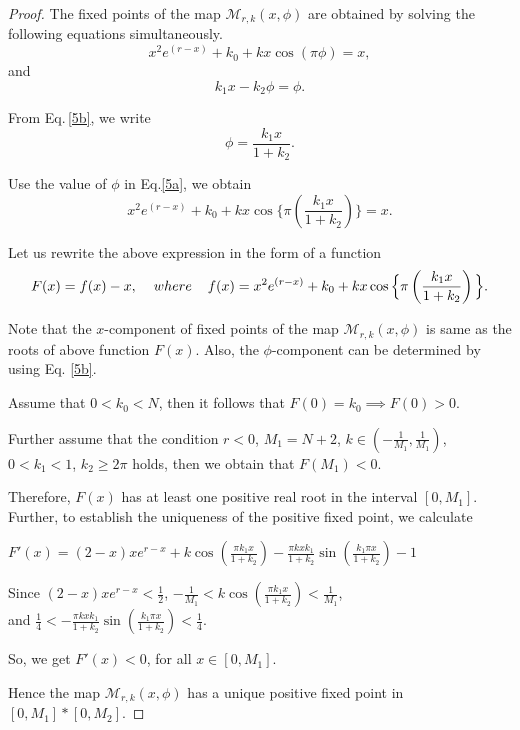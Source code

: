 \documentclass{article}
\begin{document}
\begin{proof}
     The fixed points of the map $\mathcal{M}_{r,k}(x,\phi)$ are obtained by solving the following equations simultaneously.
\begin{equation}\label{5a}
        x^2e^{(r-x)}+k_0+kx \cos(\pi\phi)=x,
\end{equation}
\noindent and
  \begin{equation}\label{5b}
         k_1x-k_2\phi=\phi.
  \end{equation}

\noindent From Eq.\,\eqref{5b}, we write
\begin{equation}\label{6}
    \phi=\frac{k_1x}{1+k_2}.
\end{equation}

\noindent Use the value of $\phi$ in Eq.\eqref{5a}, we obtain
\begin{equation}\label{7}
    x^2e^{(r-x)}+k_
0+kx \cos \Big\{\pi\left(\frac{k_1x}{1+k_2}\right) \Big\}=x.
\end{equation}

\noindent Let us rewrite the above expression in the form of a function
\begin{equation}\label{8}
   F(x)= f(x)-x, \hspace{0.4cm}  where \hspace{0.4cm} f(x)=x^2e^{(r-x)}+k_
0+kx \cos \Big\{\pi\left(\frac{k_1x}{1+k_2}\right) \Big\}.
\end{equation}

\noindent Note that the $x$-component of fixed points of the map $\mathcal{M}_{r,k}(x,\phi)$ is same as the roots of above function $F(x)$. Also, the $\phi$-component can be determined by using Eq. \eqref{5b}.

\noindent Assume that  $0<k_0<N$, then it follows that \; $F(0)=k_0 \implies F(0)>0$.


\noindent Further assume that the condition  $r<0$, $M_1=N+2$, $k\in (-\frac{1}{M_1},\frac{1}{M_1})$, $0<k_1<1$, $k_2\geq2\pi$ holds, then we obtain that \; $F(M_1)<0$.

\noindent Therefore, $F(x)$ has at least one positive real root in the interval $[0,M_1]$. Further, to establish the uniqueness of the positive fixed point, we calculate

$F'(x)=(2-x)xe^{r-x}+k \cos\left(\frac{\pi{k_1}x}{1+k_2}\right)-\frac{\pi{k}xk_1}{1+k_2} \sin\left(\frac{k_1{\pi}x}{1+k_2}\right)-1$

\noindent Since $(2-x)xe^{r-x}<\frac{1}{2}$, $-\frac{1}{M_1}<k \cos\left(\frac{\pi{k_1}x}{1+k_2}\right)<\frac{1}{M_1}$,\\ and \;
$\frac{1}{4}<-\frac{\pi{k}xk_1}{1+k_2} \sin\left(\frac{k_1{\pi}x}{1+k_2}\right)<\frac{1}{4}$. 

\vspace{0.2cm}
\noindent So, we get $F'(x)<0$,  for all $x\in[0,M_1]$.

\noindent Hence the map $\mathcal{M}_{r,k}(x,\phi)$ has a unique positive fixed point in $[0,M_1]*[0,M_2]$.
\end{proof}
\end{document}

